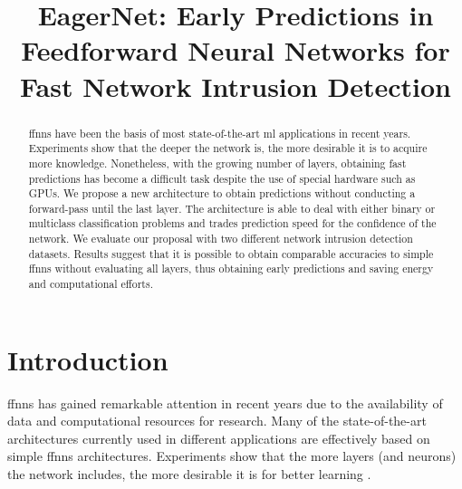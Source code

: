 \documentclass[conference]{IEEEtran}
\begin{document}
\title{EagerNet: Early Predictions in Feedforward Neural Networks for Fast Network Intrusion Detection}

\author{
}



\maketitle

\begin{abstract}

\glspl{ffnn} have been the basis of most state-of-the-art \gls{ml} applications in recent years. Experiments show that the deeper the network is, the more desirable it is to acquire more knowledge. Nonetheless, with the growing number of layers, obtaining fast predictions has become a difficult task despite the use of special hardware such as GPUs. We propose a new architecture to obtain predictions without conducting a forward-pass until the last layer. The architecture is able to deal with either binary or multiclass classification problems and trades prediction speed for the confidence of the network. We evaluate our proposal with two different network intrusion detection datasets. Results suggest that it is possible to obtain comparable accuracies to simple \glspl{ffnn} without evaluating all layers, thus obtaining early predictions and saving energy and computational efforts.

\end{abstract}

\begin{IEEEkeywords}

\end{IEEEkeywords}

\section{Introduction}
\glspl{ffnn} has gained remarkable attention in recent years due to the availability of data and computational resources for research. Many of the state-of-the-art architectures currently used in different applications are effectively based on simple \glspl{ffnn} architectures. Experiments show that the more layers (and neurons) the network includes, the more desirable it is for better learning \cite{eldan2016power} .
\end{document}
